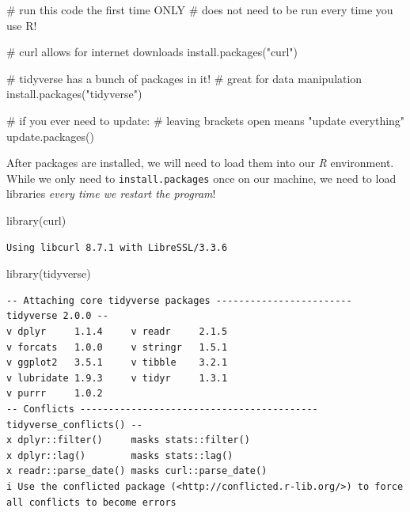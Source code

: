 \documentclass[
  letterpaper,
  DIV=11,
  numbers=noendperiod]{scrreprt}
\newenvironment{Shaded}{\begin{snugshade}}{\end{snugshade}}
\newcommand{\CommentTok}[1]{\textcolor[rgb]{0.37,0.37,0.37}{#1}}
\newcommand{\FunctionTok}[1]{\textcolor[rgb]{0.28,0.35,0.67}{#1}}
\newcommand{\NormalTok}[1]{\textcolor[rgb]{0.00,0.23,0.31}{#1}}
\newcommand{\StringTok}[1]{\textcolor[rgb]{0.13,0.47,0.30}{#1}}
\begin{document}
\begin{Shaded}
\begin{Highlighting}[]
\CommentTok{\# run this code the first time ONLY}
\CommentTok{\# does not need to be run every time you use R!}

\CommentTok{\# curl allows for internet downloads}
\FunctionTok{install.packages}\NormalTok{(}\StringTok{"curl"}\NormalTok{)}

\CommentTok{\# tidyverse has a bunch of packages in it!}
\CommentTok{\# great for data manipulation}
\FunctionTok{install.packages}\NormalTok{(}\StringTok{"tidyverse"}\NormalTok{)}

\CommentTok{\# if you ever need to update:}
\CommentTok{\# leaving brackets open means "update everything"}
\FunctionTok{update.packages}\NormalTok{()}
\end{Highlighting}
\end{Shaded}

After packages are installed, we will need to load them into our
\emph{R} environment. While we only need to \texttt{install.packages}
once on our machine, we need to load libraries \emph{every time we
restart the program}!

\begin{Shaded}
\begin{Highlighting}[]
\FunctionTok{library}\NormalTok{(curl)}
\end{Highlighting}
\end{Shaded}

\begin{verbatim}
Using libcurl 8.7.1 with LibreSSL/3.3.6
\end{verbatim}

\begin{Shaded}
\begin{Highlighting}[]
\FunctionTok{library}\NormalTok{(tidyverse)}
\end{Highlighting}
\end{Shaded}

\begin{verbatim}
-- Attaching core tidyverse packages ------------------------ tidyverse 2.0.0 --
v dplyr     1.1.4     v readr     2.1.5
v forcats   1.0.0     v stringr   1.5.1
v ggplot2   3.5.1     v tibble    3.2.1
v lubridate 1.9.3     v tidyr     1.3.1
v purrr     1.0.2     
-- Conflicts ------------------------------------------ tidyverse_conflicts() --
x dplyr::filter()     masks stats::filter()
x dplyr::lag()        masks stats::lag()
x readr::parse_date() masks curl::parse_date()
i Use the conflicted package (<http://conflicted.r-lib.org/>) to force all conflicts to become errors
\end{verbatim}
\end{document}
